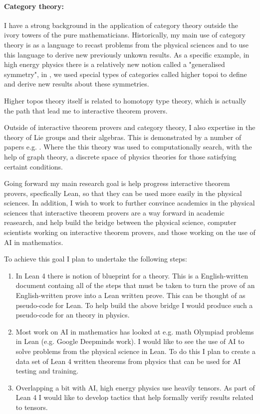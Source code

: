 \documentclass[14pt,letter]{article}
\newcounter{customtitle}
\begin{document}
\paragraph{Category theory:} I have a strong background in the application of category theory 
outside the ivory towers of the pure mathematicians. Historically, my main use of category theory 
is as a language to recast problems from the physical sciences and to use this language 
to derive new previously unkown results. As a specific example, in high energy physics 
there is a relatively new notion called a "generalised symmetry", in  , 
we used special types of categories called higher topoi to define and derive new results 
about these symmetries. 

Higher topos theory itself is related to homotopy type theory, which is actually 
the path that lead me to interactive theorem provers. 


Outside of interactive theorem provers and category theory, 
I also expertise in the theory of Lie groups and their algebras. 
This is demonstrated by a number of papers e.g. . Where 
the this theory was used to computationally search, with the help of 
graph theory, a discrete space 
of physics theories for those satisfying certaint conditions. 




Going forward my main research goal is help progress interactive theorem provers, 
specfically Lean,
so that they can be used more easily in the physical sciences. 
In addition, I wish to work to further convince academics in the physical sciences 
that interactive theorem provers are a way forward in academic reasearch, and 
help build the bridge between the physical science, computer scientists 
working on interactive theorem provers, and those working on 
the use of AI in mathematics. 

To achieve this goal I plan to undertake the following steps:

\begin{enumerate}
\item In Lean 4 there is notion of blueprint for a theory. This is 
a English-written document containg all of the steps that must be taken
to turn the prove of an English-written prove into a Lean written prove. 
This can be thought of as pseudo-code for Lean. To help build the above 
bridge I would produce such a pseudo-code for an theory in physics.
\item Most work on AI in mathematics has looked at e.g. math Olympiad problems
in Lean (e.g. Google Deepminds work). I would like to see the use 
of AI to solve problems from the physical science in Lean. To do this 
I plan to create a data set of Lean 4 written theorems from physics 
that can be used for AI testing and training.
\item Overlapping a bit with AI, high energy physics use heavily tensors. 
As part of Lean 4 I would like to develop tactics that help formally verify 
results related to tensors.
\end{enumerate}
\end{document}
